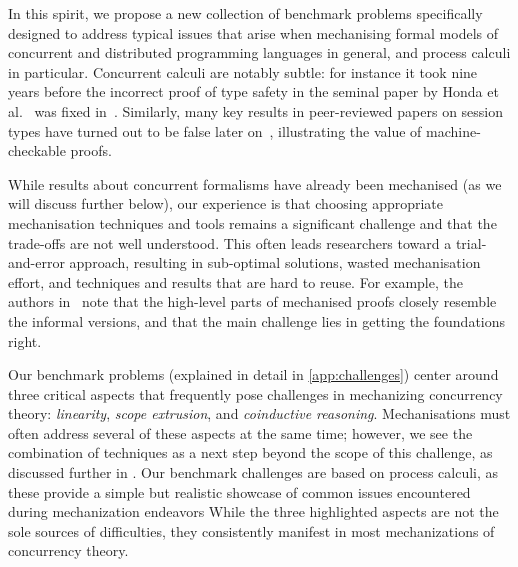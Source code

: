 \documentclass[runningheads]{llncs}
\begin{document}
In this spirit, we propose a new collection of benchmark problems
specifically designed to address typical issues that arise when
mechanising formal models of concurrent and distributed programming
languages in general, and process calculi in particular.  Concurrent
calculi are notably subtle: for instance it took nine years before the
incorrect proof of type safety in the seminal paper by Honda et
al.~\cite{Honda1998} was fixed in~\cite{Yoshida2007}.  Similarly, many
key results in peer-reviewed papers on session types have turned out
to be false later on~\cite{Gay2020,10.1145/3290343}, illustrating the
value of machine-checkable proofs.

While results about concurrent
formalisms have already been mechanised (as we will discuss further
below), our experience is that choosing appropriate mechanisation
techniques and tools remains a significant challenge and that the
trade-offs are not well understood.  This often leads researchers
toward a trial-and-error approach, resulting in sub-optimal solutions,
wasted mechanisation effort, and techniques and results that are hard
to reuse.  For example, the authors in~\cite{Cruz-Filipe2021b} note that the high-level parts of
mechanised proofs closely resemble the informal versions, and that the
main challenge lies in getting the foundations right.

Our benchmark problems (explained in detail in \cref{app:challenges}) center around three critical aspects that frequently pose challenges in mechanizing concurrency theory:
\emph{linearity}, \emph{scope extrusion}, and \emph{coinductive
  reasoning}.  Mechanisations must often address several of these
aspects at the same time; however, we see the combination of
techniques as a next step beyond the scope of this challenge, as
discussed further in .  Our benchmark
challenges are based on process calculi, as these provide a simple but
realistic showcase of common issues encountered during mechanization endeavors
While the three highlighted aspects are not the sole sources of difficulties, they
consistently manifest in most mechanizations of concurrency theory.

\end{document}
